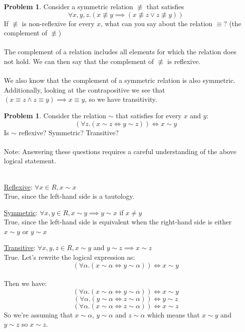 \documentclass[10pt,leqno ]{article}
\theoremstyle{definition}
\newtheorem{problem}[theorem]{Problem}
\begin{document}
\begin{problem} Consider a symmetric relation $\not\equiv$ that satisfies
$$\forall x,y,z. (x \not\equiv y \implies (x \not\equiv z \vee z \not\equiv y))$$
If $\not\equiv$ is non-reflexive for every $x$, what can you say about the relation $\equiv$? (the complement of $\not\equiv$)
\\\\
\Large
The complement of a relation includes all elements for which the relation does not hold.  We can then say that the complement of $\not\equiv$ is reflexive.
\\\\
We also know that the complement of a symmetric relation is also symmetric.  Additionally, looking at the contrapositive we see that $(x \equiv z \wedge z \equiv y) \implies x \equiv y$, so we have transitivity.
\end{problem}
\newpage

\begin{problem} Consider the relation $\sim$ that satisfies for every $x$ and $y$:
$$(\forall z. (x \sim z \Leftrightarrow y \sim z)) \Leftrightarrow x \sim y$$
Is $\sim$ reflexive?  Symmetric?  Transitive?\\\\
Note: Answering these questions requires a careful understanding of the above logical statement.
\\\\
\Large
\item \underline{Reflexive}: $\forall x \in R, x \sim x$\\
True, since the left-hand side is a tautology.\\
\item \underline{Symmetric}: $\forall x,y \in R, x \sim y \implies y \sim x $ if $x \neq y$\\
True, since the left-hand side is equivalent when the right-hand side is either $x \sim y$ or $y \sim x$\\
\item \underline{Transitive}: $\forall x,y,z \in R, x \sim y$ and $y \sim z \implies x \sim z$\\
True.  Let's rewrite the logical expression as:
$$(\forall \alpha. (x \sim \alpha \Leftrightarrow y \sim \alpha)) \Leftrightarrow x \sim y$$\\
Then we have:
$$(\forall \alpha. (x \sim \alpha \Leftrightarrow y \sim \alpha)) \Leftrightarrow x \sim y$$
$$(\forall \alpha. (y \sim \alpha \Leftrightarrow z \sim \alpha)) \Leftrightarrow y \sim z$$
$$(\forall \alpha. (x \sim \alpha \Leftrightarrow z \sim \alpha)) \Leftrightarrow x \sim z$$
So we're assuming that $x \sim \alpha$, $y \sim \alpha$ and $z \sim \alpha$ which means that $x \sim y$ and $y \sim z$ so $x \sim z$.
\end{problem}
\newpage
\end{document}
